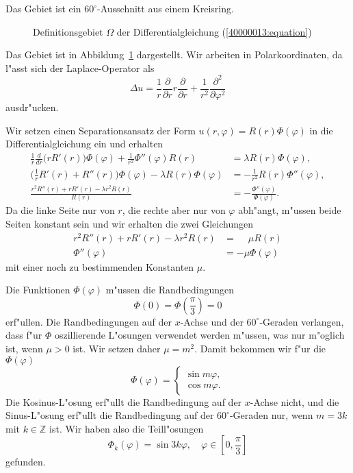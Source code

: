 \begin{loesung}
Das Gebiet ist ein $60^\circ$-Ausschnitt aus einem Kreisring.

\begin{figure}
\centering
{}
\caption{Definitionsgebiet $\Omega$ der Differentialgleichung
(\ref{40000013:equation})
\label{40000013:gebiet}
}
\end{figure}
Das Gebiet ist in Abbildung~\ref{40000013:gebiet} dargestellt.
Wir arbeiten in Polarkoordinaten, da l"asst sich der Laplace-Operator als
\[
\Delta u
=
\frac1r\frac{\partial}{\partial r}r\frac{\partial}{\partial r}
+
\frac1{r^2}
\frac{\partial^2}{\partial\varphi^2}
\]
ausdr"ucken.
\begin{teilaufgaben}
\item
Wir setzen einen Separationsansatz der Form $u(r,\varphi)=R(r)\Phi(\varphi)$
in die Differentialgleichung ein und erhalten
\begin{align*}
\frac1r\frac{d}{dr}\bigl(rR'(r)\bigr)\Phi(\varphi)
+
\frac1{r^2}
\Phi''(\varphi)R(r)
&=
\lambda R(r)\Phi(\varphi),
\\
\biggl(\frac1rR'(r)+R''(r)\biggr)\Phi(\varphi)
- \lambda R(r)\Phi(\varphi)
&=
-
\frac1{r^2}
R(r)\Phi''(\varphi),
\\
\frac{r^2R''(r)+rR'(r)-\lambda r^2R(r)}{R(r)}
&=
-\frac{\Phi''(\varphi)}{\Phi(\varphi)}.
\end{align*}
Da die linke Seite nur von $r$, die rechte aber nur von $\varphi$ abh"angt,
m"ussen beide Seiten konstant sein und wir
erhalten die zwei Gleichungen
\begin{align}
r^2R''(r)+rR'(r)-\lambda r^2 R(r)&=\phantom{-}\mu R(r)
\label{40000013:erste}
\\
\Phi''(\varphi)&=-\mu\Phi(\varphi)
\label{40000013:zweite}
\end{align}
mit einer noch zu bestimmenden Konstanten $\mu$.
\item
Die Funktionen $\Phi(\varphi)$ m"ussen die Randbedingungen
\[
\Phi(0)=\Phi({\textstyle\frac{\pi}3})=0
\]
erf"ullen.
Die Randbedingungen auf der $x$-Achse und der $60^\circ$-Geraden verlangen,
dass f"ur $\Phi$
oszillierende L"osungen verwendet werden m"ussen, was nur m"oglich ist,
wenn $\mu>0$ ist. Wir setzen daher $\mu=m^2$. Damit bekommen wir f"ur die
$\Phi(\varphi)$
\[
\Phi(\varphi)=\begin{cases}\sin m\varphi,\\\cos m\varphi.\end{cases}
\]
Die Kosinus-L"osung erf"ullt die Randbedingung auf der $x$-Achse nicht,
und die Sinus-L"osung erf"ullt die Randbedingung auf der $60^\circ$-Geraden nur,
wenn $m=3k$ mit $k\in\mathbb Z$ ist.
Wir haben also die Teill"osungen
\[
\Phi_k(\varphi)=\sin 3k\varphi, \quad\varphi\in[0,{\textstyle \frac{\pi}3}]
\]
gefunden.


\end{teilaufgaben}
\end{loesung}
